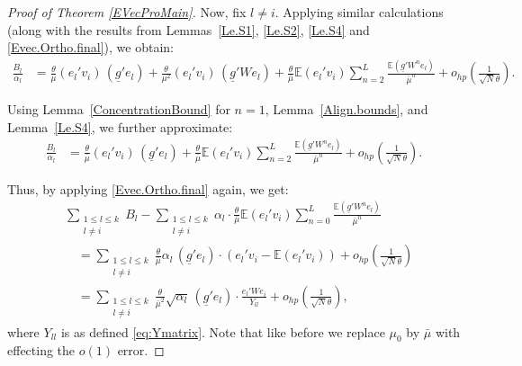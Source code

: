 \documentclass[11pt, reqno]{amsart}
\numberwithin{equation}{section}
\begin{document}
\begin{proof}[Proof of Theorem \ref{EVecProMain}]
Now, fix \( l \ne i \). Applying similar calculations (along with the results from Lemmas~\ref{Le.S1}, \ref{Le.S2}, \ref{Le.S4} and \eqref{Evec.Ortho.final}), we obtain:
\begin{align*}
\frac{B_l}{\alpha_l} 
&= \frac{\theta}{\mu} (e_l' v_i)\, (\underline{g}' e_l) 
+ \frac{\theta}{\mu^2} (e_l' v_i)\, (\underline{g}' W e_l) 
+ \frac{\theta}{\bar{\mu}} \mathbb{E}(e_l' v_i) \sum_{n=2}^L \frac{ \mathbb{E}(\underline{g}' W^n e_l) }{ \bar{\mu}^n } 
+ o_{hp}\left( \frac{1}{\sqrt{N} \theta} \right).
\end{align*}

Using Lemma~\ref{ConcentrationBound} for \( n = 1 \), Lemma~\ref{Align.bounds}, and Lemma~\ref{Le.S4}, we further approximate:
\begin{align*}
\frac{B_l}{\alpha_l} 
&= \frac{\theta}{\bar{\mu}} (e_l' v_i)\, (\underline{g}' e_l) 
+ \frac{\theta}{\bar{\mu}} \mathbb{E}(e_l' v_i) \sum_{n=2}^L \frac{ \mathbb{E}(\underline{g}' W^n e_l) }{ \bar{\mu}^n } 
+ o_{hp}\left( \frac{1}{\sqrt{N} \theta} \right).
\end{align*}

Thus, by applying \eqref{Evec.Ortho.final} again, we get:
\begin{align}
\nonumber
& \sum_{\substack{1 \le l \le k \\ l \ne i}} B_l 
- \sum_{\substack{1 \le l \le k \\ l \ne i}} \alpha_l \cdot \frac{\theta}{\bar{\mu}} \mathbb{E}(e_l' v_i) \sum_{n=0}^L \frac{ \mathbb{E}(\underline{g}' W^n e_l) }{ \bar{\mu}^n } \\
\nonumber
&\quad = \sum_{\substack{1 \le l \le k \\ l \ne i}} \frac{\theta}{\bar{\mu}} \alpha_l\, (\underline{g}' e_l) \cdot \left( e_l' v_i - \mathbb{E}(e_l' v_i) \right) + o_{hp}\left( \frac{1}{\sqrt{N} \theta} \right) \\
\label{EVecProTh1.Orthopart}
&\quad = \sum_{\substack{1 \le l \le k \\ l \ne i}} \frac{\theta}{\bar{\mu}^2} \sqrt{\alpha_l}\, (\underline{g}' e_l) \cdot \frac{e_l' W e_i}{Y_{ll}} + o_{hp}\left( \frac{1}{\sqrt{N} \theta} \right),
\end{align}
where \( Y_{ll} \) is as defined \eqref{eq:Ymatrix}. Note that like before we replace $\mu_0$ by $\bar{\mu}$ with effecting the $o(1)$ error.


\end{proof}
\end{document}
